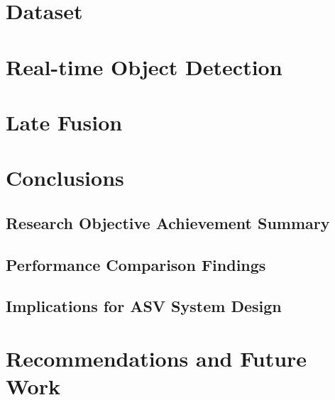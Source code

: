 \documentclass{erauthesis}
\begin{document}
\chapter{Dataset}

\chapter{Real-time Object Detection}

\chapter{Late Fusion}

\chapter{Conclusions}


\section{Research Objective Achievement Summary}

\section{Performance Comparison Findings}

\section{Implications for ASV System Design}

\chapter{Recommendations and Future Work}

\end{document}
